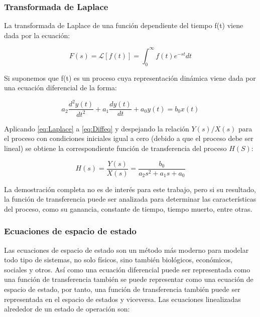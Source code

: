 		\subsubsection{Transformada de Laplace}
		
			La transformada de Laplace de una función dependiente del tiempo f(t) viene dada por la ecuación:
			
			\begin{equation}\label{eq:Laplace}
				F(s) = \mathcal{L}\left[f(t) \right] = \int_{0}^{\infty} f(t)e^{-st}dt
			\end{equation}
			
			Si suponemos que f(t) es un proceso cuya representación dinámica viene dada por una ecuación diferencial de la forma:
			
			\begin{equation}\label{eq:Diffeq}
				a_{2}\frac{d^{2}y(t)}{dt^{2}} + a_{1}\frac{dy(t)}{dt} + a_{0}y(t) = b_{0}x(t)
			\end{equation}
			
			Aplicando \cref{eq:Laplace} a \cref{eq:Diffeq}  y despejando la relación $Y(s)/X(s)$ para el proceso con condiciones iniciales igual a cero (debido a que el proceso debe ser lineal) se obtiene la correspondiente función de transferencia del proceso $H(S)$:
			
			 \begin{equation}\label{eq:TransferFunction}
			 	H(s) =	\frac{Y(s)}{X(s)} = \frac{b_{0}}{a_{2}s^{2} + a_{1}s + a_{0}}
			 \end{equation}
			 
			 La demostración completa \Parencite[pp.$\,$21-22]{smith1985principles} no es de interés para este trabajo, pero si su resultado, la función de transferencia puede ser analizada para determinar las características del proceso, como su ganancia, constante de tiempo, tiempo muerto, entre otras.
			 
		 \subsubsection{Ecuaciones de espacio de estado}
		 
		 	Las ecuaciones de espacio de estado son un método más moderno para modelar todo tipo de sistemas, no solo físicos, sino también biológicos, económicos, sociales y otros. Así como una ecuación diferencial puede ser representada como una función de transferencia también se puede representar como una ecuación de espacio de estado, por tanto, una función de transferencia también puede ser representada en el espacio de estados y viceversa. Las ecuaciones linealizadas alrededor de un estado de operación \Parencite[p.$\,$31]{ogata2003ingenieria} son:
		 

